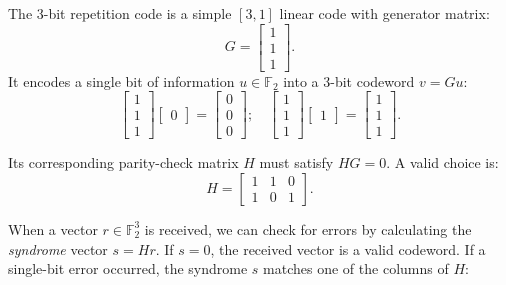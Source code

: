 \begin{example}\label{ex:repetition_code}
The 3-bit repetition code is a simple $[3, 1]$ linear code with generator matrix:
\begin{equation}
G = \begin{bmatrix}1 \\ 1 \\ 1\end{bmatrix}
.\end{equation}
It encodes a single bit of information $u \in \mathbb{F}_2$ into a 3-bit codeword $v = Gu$:
\begin{equation}
\begin{bmatrix}1 \\ 1 \\ 1\end{bmatrix} \begin{bmatrix} 0 \end{bmatrix} = \begin{bmatrix} 0 \\ 0 \\ 0 \end{bmatrix};\quad \begin{bmatrix}1 \\ 1 \\ 1\end{bmatrix} \begin{bmatrix} 1 \end{bmatrix} = \begin{bmatrix} 1 \\ 1 \\ 1 \end{bmatrix}
.\end{equation}

Its corresponding parity-check matrix $H$ must satisfy $H G = 0$. A valid choice is:
\begin{equation}
H = \begin{bmatrix}1 & 1 & 0 \\ 1 & 0 & 1\end{bmatrix}
.\end{equation}

When a vector $r \in \mathbb{F}_2^3$ is received, we can check for errors by calculating the \textit{syndrome} vector $s = H r$. If $s = 0$, the received vector is a valid codeword. If a single-bit error occurred, the syndrome $s$ matches one of the columns of $H$:


\end{example}
